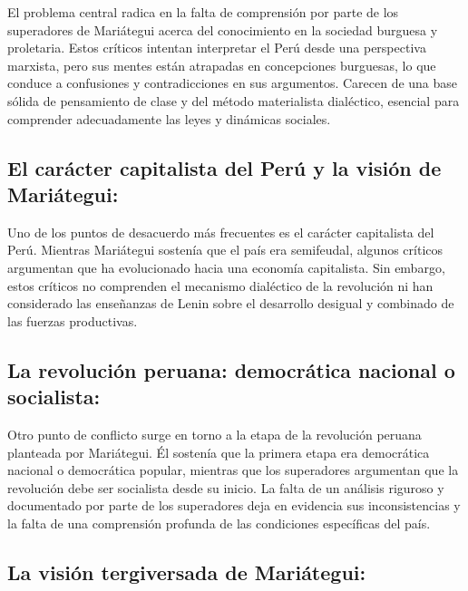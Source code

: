 \documentclass[
  a4paper,
]{article}
\begin{document}
El problema central radica en la falta de comprensión por parte de los
superadores de Mariátegui acerca del conocimiento en la sociedad
burguesa y proletaria. Estos críticos intentan interpretar el Perú desde
una perspectiva marxista, pero sus mentes están atrapadas en
concepciones burguesas, lo que conduce a confusiones y contradicciones
en sus argumentos. Carecen de una base sólida de pensamiento de clase y
del método materialista dialéctico, esencial para comprender
adecuadamente las leyes y dinámicas sociales.

\hypertarget{el-caruxe1cter-capitalista-del-peruxfa-y-la-visiuxf3n-de-mariuxe1tegui}{%
\subsection{El carácter capitalista del Perú y la visión de
Mariátegui:}\label{el-caruxe1cter-capitalista-del-peruxfa-y-la-visiuxf3n-de-mariuxe1tegui}}

Uno de los puntos de desacuerdo más frecuentes es el carácter
capitalista del Perú. Mientras Mariátegui sostenía que el país era
semifeudal, algunos críticos argumentan que ha evolucionado hacia una
economía capitalista. Sin embargo, estos críticos no comprenden el
mecanismo dialéctico de la revolución ni han considerado las enseñanzas
de Lenin sobre el desarrollo desigual y combinado de las fuerzas
productivas.

\hypertarget{la-revoluciuxf3n-peruana-democruxe1tica-nacional-o-socialista}{%
\subsection{La revolución peruana: democrática nacional o
socialista:}\label{la-revoluciuxf3n-peruana-democruxe1tica-nacional-o-socialista}}

Otro punto de conflicto surge en torno a la etapa de la revolución
peruana planteada por Mariátegui. Él sostenía que la primera etapa era
democrática nacional o democrática popular, mientras que los superadores
argumentan que la revolución debe ser socialista desde su inicio. La
falta de un análisis riguroso y documentado por parte de los superadores
deja en evidencia sus inconsistencias y la falta de una comprensión
profunda de las condiciones específicas del país.

\hypertarget{la-visiuxf3n-tergiversada-de-mariuxe1tegui}{%
\subsection{La visión tergiversada de
Mariátegui:}\label{la-visiuxf3n-tergiversada-de-mariuxe1tegui}}
\end{document}
